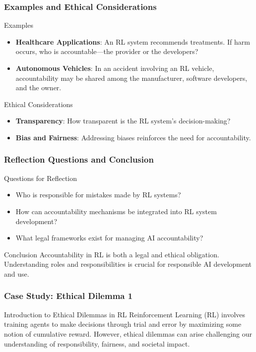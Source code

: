 \documentclass{beamer}
\begin{document}
\begin{frame}[fragile]
    \frametitle{Examples and Ethical Considerations}
    \begin{block}{Examples}
        \begin{itemize}
            \item \textbf{Healthcare Applications}: 
                An RL system recommends treatments. If harm occurs, who is accountable—the provider or the developers?
            \item \textbf{Autonomous Vehicles}:
                In an accident involving an RL vehicle, accountability may be shared among the manufacturer, software developers, and the owner.
        \end{itemize}
    \end{block}
    \begin{block}{Ethical Considerations}
        \begin{itemize}
            \item \textbf{Transparency}: How transparent is the RL system's decision-making?
            \item \textbf{Bias and Fairness}: Addressing biases reinforces the need for accountability.
        \end{itemize}
    \end{block}
\end{frame}

\begin{frame}[fragile]
    \frametitle{Reflection Questions and Conclusion}
    \begin{block}{Questions for Reflection}
        \begin{itemize}
            \item Who is responsible for mistakes made by RL systems?
            \item How can accountability mechanisms be integrated into RL system development?
            \item What legal frameworks exist for managing AI accountability?
        \end{itemize}
    \end{block}
    \begin{block}{Conclusion}
        Accountability in RL is both a legal and ethical obligation. Understanding roles and responsibilities is crucial for responsible AI development and use.
    \end{block}
\end{frame}

\begin{frame}
    \frametitle{Case Study: Ethical Dilemma 1}
    \begin{block}{Introduction to Ethical Dilemmas in RL}
        Reinforcement Learning (RL) involves training agents to make decisions through trial and error by maximizing some notion of cumulative reward. 
        However, ethical dilemmas can arise challenging our understanding of responsibility, fairness, and societal impact.
    \end{block}
\end{frame}
\end{document}
